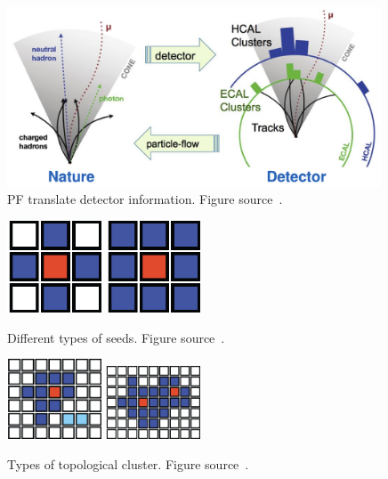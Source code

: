 \begin{figure}[t!]
\centering
\includegraphics[width=0.99\textwidth]{figures/PF.png}
\caption[PF translate detector information]{PF translate detector information. Figure source~\cite{}.}
\label{fig:PF_diagram}
\end{figure}

\begin{figure}[t!]
\centering
\includegraphics[width=0.25\textwidth]{figures/seed_4neighbours.png}
\includegraphics[width=0.25\textwidth]{figures/seed_8neighbours.png}
\caption[Different types of seeds]{Different types of seeds. Figure source~\cite{}.}
\label{fig:seeds}
\end{figure}

\begin{figure}[t!]
\centering
\includegraphics[width=0.25\textwidth]{figures/topological_cluster_oneseed.png}
\includegraphics[width=0.25\textwidth]{figures/topological_cluster_many_Seeds.png}
\caption[Types of topological cluster]{Types of topological cluster. Figure source~\cite{}.}
\label{fig:topo_cluster}
\end{figure}

